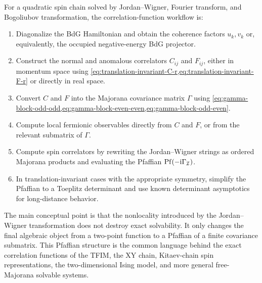 For a quadratic spin chain solved by Jordan--Wigner, Fourier transform, and
Bogoliubov transformation, the correlation-function workflow is:
\begin{enumerate}[label=(\roman*)]
    \item Diagonalize the BdG Hamiltonian and obtain the coherence factors
    $u_k,v_k$ or, equivalently, the occupied negative-energy BdG projector.
    \item Construct the normal and anomalous correlators $C_{ij}$ and $F_{ij}$,
    either in momentum space using \cref{eq:translation-invariant-C-r,eq:translation-invariant-F-r}
    or directly in real space.
    \item Convert $C$ and $F$ into the Majorana covariance matrix $\Gamma$ using
    \cref{eq:gamma-block-odd-odd,eq:gamma-block-even-even,eq:gamma-block-odd-even}.
    \item Compute local fermionic observables directly from $C$ and $F$, or from
    the relevant submatrix of $\Gamma$.
    \item Compute spin correlators by rewriting the Jordan--Wigner strings as
    ordered Majorana products and evaluating the Pfaffian
    $\operatorname{Pf}(-\mathrm{i}\Gamma_{\mathcal{I}})$.
    \item In translation-invariant cases with the appropriate symmetry, simplify
    the Pfaffian to a Toeplitz determinant and use known determinant asymptotics
    for long-distance behavior.
\end{enumerate}

The main conceptual point is that the nonlocality introduced by the
Jordan--Wigner transformation does not destroy exact solvability.  It only
changes the final algebraic object from a two-point function to a Pfaffian of a
finite covariance submatrix.  This Pfaffian structure is the common language
behind the exact correlation functions of the TFIM, the XY chain, Kitaev-chain
spin representations, the two-dimensional Ising model, and more general
free-Majorana solvable systems.

